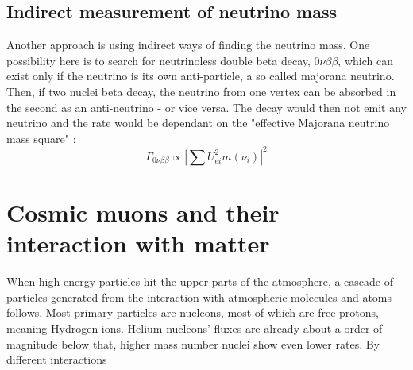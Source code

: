     \subsection{Indirect measurement of neutrino mass}
    \label{ch:Introduction:sec:Massive neutrino:subsec:indirect Neutrino Mass measurement}
    Another approach is using indirect ways of finding the neutrino mass. One possibility here is to search for neutrinoless double beta decay, $0\nu\beta\beta$, which can exist only if the neutrino is its own anti-particle, a so called majorana neutrino. Then, if two nuclei beta decay, the neutrino from one vertex can be absorbed in the second as an anti-neutrino - or vice versa. The decay would then not emit any neutrino and the rate would be dependant on the "effective Majorana neutrino mass square" \cite{currentNeutrinoSearches}:
    \begin{equation}
    	\Gamma_{0\nu\beta\beta} \propto \left| \sum{U_{ei}^2m\left(\nu_i\right)}\right|^2
    \end{equation}

    
    \section{Cosmic muons and their interaction with matter}
    \label{ch:introduction:sec:Cosmic Air Showers}
    When high energy particles hit the upper parts of the atmosphere, a cascade of particles generated from the interaction with atmospheric molecules and atoms follows. Most primary particles are nucleons, most of which are free protons, meaning Hydrogen ions. Helium nucleons' fluxes are already about a order of magnitude below that, higher mass number nuclei show even lower rates\cite{highEnergyCosmicRays}. By different interactions 

